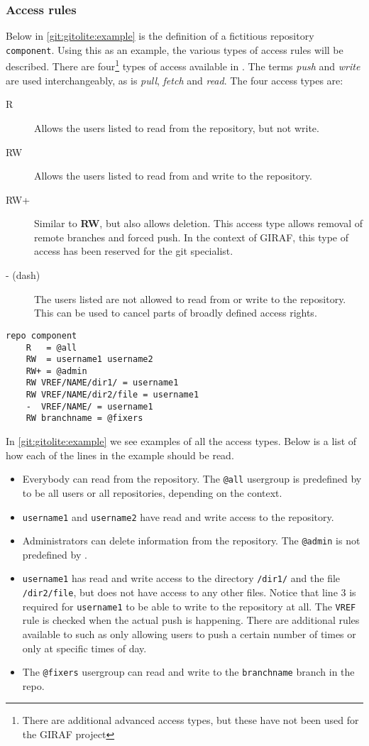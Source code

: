 \subsubsection{Access rules}
Below in \cref{git:gitolite:example} is the definition of a fictitious repository \texttt{component}.
Using this as an example, the various types of access rules will be described.
There are four\footnote{There are additional advanced access types, but these have not been used for the GIRAF project} types of access available in \gitolite{}.
The terms \textit{push} and \textit{write} are used interchangeably, as is \textit{pull}, \textit{fetch} and \textit{read}.
The four access types are:
\begin{description}
\item[R] Allows the users listed to read from the repository, but not write.
\item[RW] Allows the users listed to read from and write to the repository.
\item[RW+] Similar to \textbf{RW}, but also allows deletion.
This access type allows removal of remote branches and forced push.
In the context of GIRAF, this type of access has been reserved for the git specialist.
\item[- (dash)] The users listed are not allowed to read from or write to the repository.
This can be used to cancel parts of broadly defined access rights.
\end{description}
\begin{lstlisting}[caption={A \gitolite{} configuration file},label=git:gitolite:example]
repo component
    R   = @all
    RW  = username1 username2
    RW+ = @admin
    RW VREF/NAME/dir1/ = username1
    RW VREF/NAME/dir2/file = username1
    -  VREF/NAME/ = username1
    RW branchname = @fixers
\end{lstlisting}
In \cref{git:gitolite:example} we see examples of all the access types.
Below is a list of how each of the lines in the example should be read.
\begin{itemize}
\item Everybody can read from the repository.
The \texttt{@all} usergroup is predefined by \gitolite{} to be all users or all repositories, depending on the context.
\item \texttt{username1} and \texttt{username2} have read and write access to the repository.
\item Administrators can delete information from the repository.
The \texttt{@admin} is not predefined by \gitolite{}.
\item \texttt{username1} has read and write access to the directory \texttt{/dir1/} and the file \texttt{/dir2/file}, but does not have access to any other files.
Notice that line 3 is required for \texttt{username1} to be able to write to the repository at all.
The \texttt{VREF} rule is checked when the actual push is happening.
There are additional rules available to \gitolite{} such as only allowing users to push a certain number of times or only at specific times of day.
\item The \texttt{@fixers} usergroup can read and write to the \texttt{branchname} branch in the repo.
\end{itemize}
